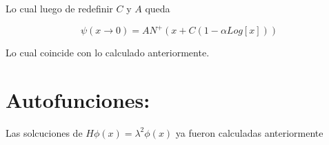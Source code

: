 Lo cual luego de redefinir $C$ y $A$ queda 

\begin{equation}
\psi (x \rightarrow 0 ) = A N ^{+} 
\left(
x + C (1- \alpha Log[x] )
\right)
\end{equation}

Lo cual coincide con lo calculado anteriormente.

\section{Autofunciones:}

Las solcuciones de $H \phi (x) = \lambda ^2 \phi (x)$ ya fueron calculadas anteriormente 